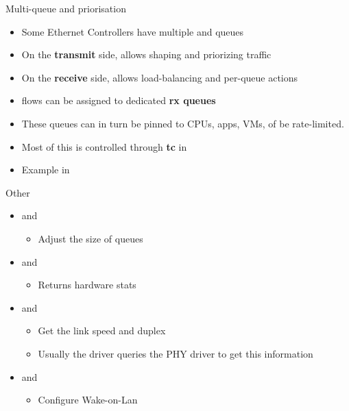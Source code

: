 \begin{frame}{Multi-queue and priorisation}
	\begin{itemize}
		\item Some Ethernet Controllers have multiple  and queues
		\item On the \textbf{transmit} side, allows shaping and priorizing traffic
		\item On the \textbf{receive} side, allows load-balancing and per-queue actions
		\item flows can be assigned to dedicated \textbf{rx queues}
		\item These queues can in turn be pinned to CPUs, apps, VMs, of be rate-limited.
		\item Most of this is controlled through \textbf{tc} in 
		\item Example in 
	\end{itemize}
\end{frame}

\begin{frame}{Other }
	\begin{itemize}
		\item {} and 
			\begin{itemize}
				\item Adjust the size of queues
			\end{itemize}
		\item {} and 
			\begin{itemize}
				\item Returns hardware stats
			\end{itemize}
		\item {} and 
			\begin{itemize}
				\item Get the link speed and duplex
				\item Usually the driver queries the PHY driver to get this information
			\end{itemize}
		\item {} and 
			\begin{itemize}
				\item Configure Wake-on-Lan
			\end{itemize}
	\end{itemize}
\end{frame}


